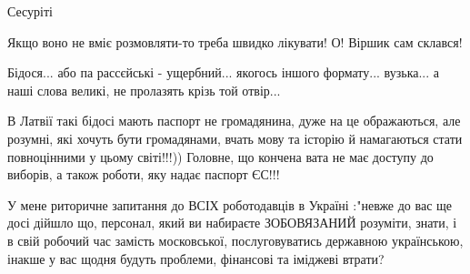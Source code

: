\begin{itemize}
Сесуріті

 
Якщо воно не вміє розмовляти-то треба швидко лікувати! О! Віршик сам склався!

 
Бідося... або па рассєйські - ущербний... якогось іншого формату... вузька... а
наші слова великі, не пролазять крізь той отвір...

 

В Латвії такі бідосі мають паспорт не громадянина, дуже на це ображаються, але
розумні, які хочуть бути громадянами, вчать мову та історію й намагаються стати
повноцінними у цьому світі!!!)) Головне, що кончена вата не має доступу до
виборів, а також роботи, яку надає паспорт ЄС!!!


 

У мене риторичне запитання до ВСІХ роботодавців в Україні :"невже до вас ще
досі дійшло що, персонал, який ви набираєте ЗОБОВЯЗАНИЙ розуміти, знати, і в
свій робочий час замість московської, послуговуватись державною
українською, інакше у вас щодня будуть проблеми, фінансові та іміджеві втрати?
🤔

\end{itemize}

